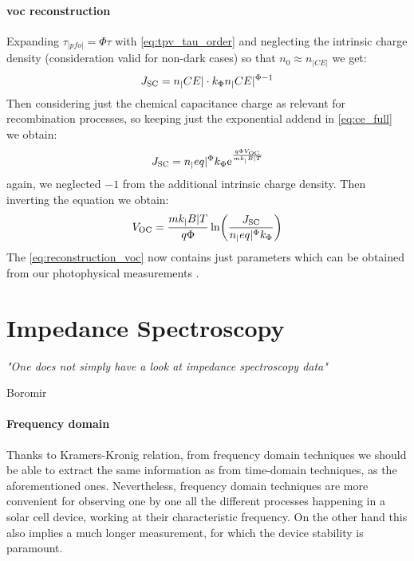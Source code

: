 \paragraph{\Gls{voc} reconstruction}
Expanding $\tau_|pfo| = \Phi \tau$ with \cref{eq:tpv_tau_order} and neglecting the intrinsic charge density (consideration valid for non-dark cases) so that $n_0 \approx n_|CE|$ we get:
\begin{equation}
J_\mathrm{SC} = n_|CE| \cdot k_\Phi n_|CE|^{\Phi-1}
\end{equation}
Then considering just the chemical capacitance charge as relevant for recombination processes, so keeping just the exponential addend in \cref{eq:ce_full} we obtain:
\begin{equation}
J_\mathrm{SC} = n_|eq|^\Phi k_\Phi \mathrm{e}^{\frac{q \Phi V_\mathrm{OC}}{m k_|B| T}}
\end{equation}
again, we neglected $-1$ from the additional intrinsic charge density. Then inverting the equation we obtain:
\begin{equation}\label{eq:reconstruction_voc}
	V_\mathrm{OC} = \frac{m k_|B| T}{q \Phi} \ln( \frac{J_\mathrm{SC}}{n_|eq|^\Phi k_\Phi} )
\end{equation}
The \cref{eq:reconstruction_voc} now contains just parameters which can be obtained from our photophysical measurements \cite{Wheeler2015,Wheeler2017,Du2018,Barnes2011a}.

\section{Impedance Spectroscopy}
\epigraph{\textit{"One does not simply have a look at impedance spectroscopy data"}}{Boromir}

\paragraph{Frequency domain}
Thanks to Kramers-Kronig relation, from frequency domain techniques we should be able to extract the same information as from time-domain techniques, as the aforementioned ones.
Nevertheless, frequency domain techniques are more convenient for observing one by one all the different processes happening in a solar cell device, working at their characteristic frequency.
On the other hand this also implies a much longer measurement, for which the device stability is paramount.

